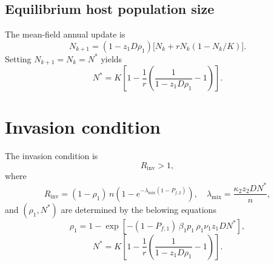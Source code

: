 \documentclass[12pt]{article}
\begin{document}
\subsection{Equilibrium host population size}
The mean-field annual update is
\[
N_{k+1}
=
(1-z_1 D \rho_1)\Big[N_k+rN_k(1-N_k/K)\Big].
\]
Setting $N_{k+1}=N_k=N^*$ yields
\[
N^*
=
K\left[
1-\frac{1}{r}\left(\frac{1}{1-z_1 D\rho_1}-1\right)
\right].
\]

\section{Invasion condition}
The invasion condition is
\[
R_{\mathrm{inv}} > 1,
\]
where
\[
R_{\mathrm{inv}}
=
(1-\rho_1)\,n\left(1-e^{-\lambda_{\mathrm{mix}}(1-P_{f,2})}\right),
\quad
\lambda_{\mathrm{mix}}=\frac{\kappa_2 z_2 D N^*}{n},
\]
and $(\rho_1,N^*)$ are determined by the belowing equations
\[
\rho_1
=
1-\exp\!\left[-(1-P_{f,1})\,\beta_1 p_1\,\rho_1 \nu_1 z_1 D N^*\right],
\]
\[
N^*
=
K\left[
1-\frac{1}{r}\left(\frac{1}{1-z_1 D\rho_1}-1\right)
\right].
\]
\end{document}
